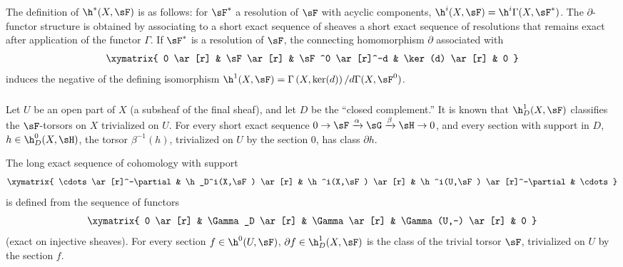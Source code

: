 \subsubsection{}\label{IV:1-1-3}

\marginpar{!}The definition of $\h^*(X,\sF)$ is as follows: for $\sF^*$ a
resolution of $\sF$ with acyclic components,
$\h^i(X,\sF) = \h^i\Gamma(X,\sF^*)$. The $\partial$-functor structure is
obtained by associating to a short exact sequence of sheaves a short exact
sequence of resolutions that remains exact after application of the functor
$\Gamma$. If $\sF^*$ is a resolution of $\sF$, the connecting
homomorphism $\partial$ associated with
\[\xymatrix{
  0 \ar[r]
    & \sF \ar[r]
    & \sF^0 \ar[r]^-d
    & \ker(d) \ar[r]
    & 0
}\]
induces the negative of the defining isomorphism
$\h^1(X,\sF) = \Gamma\left(X,\ker(d)\right)/d \Gamma(X,\sF^0)$.






\subsubsection{}\label{IV:1-1-4}

Let $U$ be an open part of $X$ (a subsheaf of the final sheaf), and let $D$
be the ``closed complement.'' It is known that $\h_D^1(X,\sF)$ classifies
the $\sF$-torsors on $X$ trivialized on $U$. For every short exact sequence
$0\to \sF\xrightarrow\alpha \sG\xrightarrow\beta\sH\to 0$, and every
section with support in $D$, $h\in\h_D^0(X,\sH)$, the torsor
$\beta^{-1}(h)$, trivialized on $U$ by the section $0$, has class
$\partial h$.

The long exact sequence of cohomology with support
\[\xymatrix{
  \cdots \ar[r]^-\partial
    & \h_D^i(X,\sF) \ar[r]
    & \h^i(X,\sF) \ar[r]
    & \h^i(U,\sF) \ar[r]^-\partial
    & \cdots
}\]
is defined from the sequence of functors
\[\xymatrix{
  0 \ar[r]
    & \Gamma_D \ar[r]
    & \Gamma \ar[r]
    & \Gamma(U,-) \ar[r]
    & 0
}\]
(exact on injective sheaves). For every section $f\in \h^0(U,\sF)$,
$\partial f\in \h_D^1(X,\sF)$ is the class of the trivial torsor $\sF$,
trivialized on $U$ by the section $f$.






\subsubsection{}\label{IV:1-1-5}

